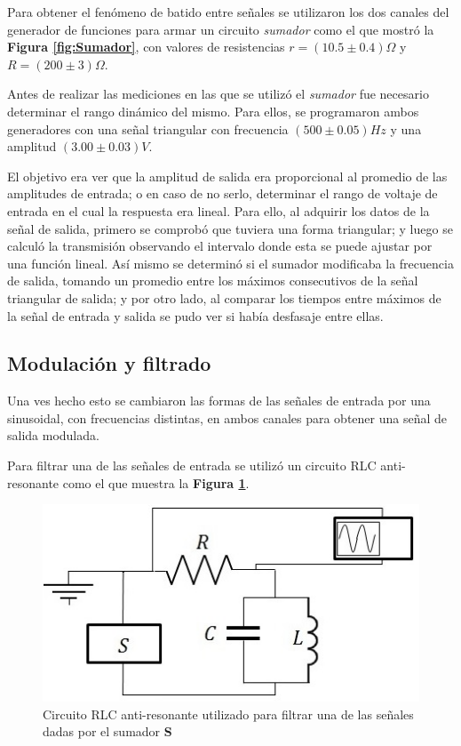 \documentclass[11pt,a4paper]{article}
\begin{document}
Para obtener el fenómeno de batido entre señales se utilizaron los dos canales del generador de funciones para armar un circuito \textit{sumador} como el que mostró la \textbf{Figura \ref{fig:Sumador}}, con valores de resistencias $r=(10.5 \pm 0.4)\Omega$ y $R=(200 \pm 3)\Omega$.

Antes de realizar las mediciones en las que se utilizó el \textit{sumador} fue necesario determinar el rango dinámico del mismo. Para ellos, se programaron ambos generadores con una señal triangular con frecuencia $(500 \pm 0.05) Hz$ y una amplitud $(3.00 \pm 0.03)V$.

El objetivo era ver que la amplitud de salida era proporcional al promedio de las amplitudes de entrada; o en caso de no serlo, determinar el rango de voltaje de entrada en el cual la respuesta era lineal. Para ello, al adquirir los datos de la señal de salida, primero se comprobó que tuviera una forma triangular; y luego se calculó la transmisión observando el intervalo donde esta se puede ajustar por una función lineal. Así mismo se determinó si el sumador modificaba la frecuencia de salida, tomando un promedio entre los máximos consecutivos de la señal triangular de salida; y por otro lado, al comparar los tiempos entre máximos de la señal de entrada y salida se pudo ver si había desfasaje entre ellas. 

\newpage
\subsection{Modulación y filtrado}
Una ves hecho esto se cambiaron las formas de las señales de entrada por una sinusoidal, con frecuencias distintas, en ambos canales para obtener una señal de salida modulada.

Para filtrar una de las señales de entrada se utilizó un circuito RLC anti-resonante como el que muestra la \textbf{Figura \ref{fig:filtro}}. 

\begin{figure}[h]
\centering
\includegraphics[scale=0.65]{filtro}
\caption{Circuito RLC anti-resonante utilizado para filtrar una de las señales dadas por el sumador \textbf{S}}
\label{fig:filtro}
\end{figure}
\end{document}

